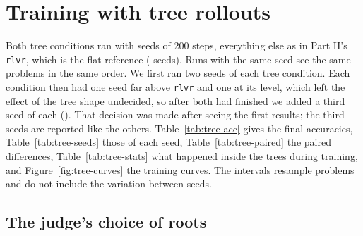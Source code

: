 
\section{Training with tree rollouts}\label{sec:res-tree}

Both tree conditions ran with  seeds of 200 steps, everything else as in Part II's \texttt{rlvr},
which is the flat reference ( seeds). Runs with the same seed see the same problems in the same order.
We first ran two seeds of each tree condition. Each condition then had one seed far above \texttt{rlvr} and one at its
level, which left the effect of the tree shape undecided, so after both had finished we added a third seed of each
(). That decision was made after seeing the first results; the third seeds are reported like
the others. Table~\ref{tab:tree-acc} gives the final accuracies, Table~\ref{tab:tree-seeds} those of each seed,
Table~\ref{tab:tree-paired} the paired differences, Table~\ref{tab:tree-stats} what happened inside the trees during
training, and Figure~\ref{fig:tree-curves} the training curves. The intervals resample problems and do not include the
variation between seeds.

\subsection{The judge's choice of roots}\label{sec:res-tree-choice}

